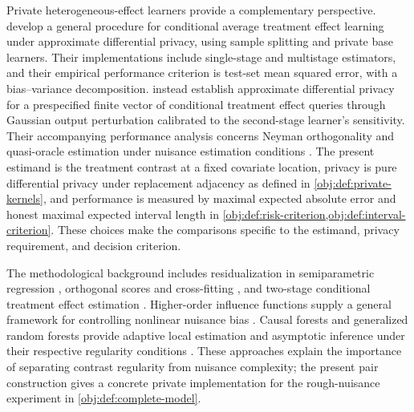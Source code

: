 \documentclass[11pt]{article}
\begin{document}
Private heterogeneous-effect learners provide a complementary perspective. \citet{NiuEtAl2022} develop a general procedure for conditional average treatment effect learning under approximate differential privacy, using sample splitting and private base learners. Their implementations include single-stage and multistage estimators, and their empirical performance criterion is test-set mean squared error, with a bias--variance decomposition. \citet[][Theorem 1]{SchroderMelnychukFeuerriegel2025} instead establish approximate differential privacy for a prespecified finite vector of conditional treatment effect queries through Gaussian output perturbation calibrated to the second-stage learner's sensitivity. Their accompanying performance analysis concerns Neyman orthogonality and quasi-oracle estimation under nuisance estimation conditions \citep[][Theorem 2]{SchroderMelnychukFeuerriegel2025}. The present estimand is the treatment contrast at a fixed covariate location, privacy is pure differential privacy under replacement adjacency as defined in \cref{obj:def:private-kernels}, and performance is measured by maximal expected absolute error and honest maximal expected interval length in \cref{obj:def:risk-criterion,obj:def:interval-criterion}. These choices make the comparisons specific to the estimand, privacy requirement, and decision criterion.

The methodological background includes residualization in semiparametric regression \citep{Robinson1988}, orthogonal scores and cross-fitting \citep{Chernozhukov2018}, and two-stage conditional treatment effect estimation \citep{Nie2021,Kennedy2023}. Higher-order influence functions supply a general framework for controlling nonlinear nuisance bias \citep{Robins2008}. Causal forests and generalized random forests provide adaptive local estimation and asymptotic inference under their respective regularity conditions \citep{WagerAthey2018,Athey2019}. These approaches explain the importance of separating contrast regularity from nuisance complexity; the present pair construction gives a concrete private implementation for the rough-nuisance experiment in \cref{obj:def:complete-model}.
\end{document}
